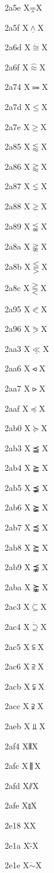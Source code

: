 \documentclass[11pt]{article}
\begin{document}
2a5e X{\ensuremath{\doublebarwedge}}X

2a5f X{\ensuremath{\underline{\wedge}}}X

2a6d X{\ensuremath{\dot{\cong}}}X

2a6f X{\ensuremath{\hat{\approx}}}X

2a74 X{\ensuremath{\Coloneqq}}X

2a7d X{\ensuremath{\leqslant}}X

2a7e X{\ensuremath{\geqslant}}X

2a85 X{\ensuremath{\lessapprox}}X

2a86 X{\ensuremath{\gtrapprox}}X

2a87 X{\ensuremath{\lneq}}X

2a88 X{\ensuremath{\gneq}}X

2a89 X{\ensuremath{\lnapprox}}X

2a8a X{\ensuremath{\gnapprox}}X

2a8b X{\ensuremath{\lesseqqgtr}}X

2a8c X{\ensuremath{\gtreqqless}}X

2a95 X{\ensuremath{\eqslantless}}X

2a96 X{\ensuremath{\eqslantgtr}}X

2aa3 X{\ensuremath{\underline{\ll}}}X

2aa6 X{\ensuremath{\leftslice}}X

2aa7 X{\ensuremath{\rightslice}}X

2aaf X{\ensuremath{\preceq}}X

2ab0 X{\ensuremath{\succeq}}X

2ab3 X{\ensuremath{\preceqq}}X

2ab4 X{\ensuremath{\succeqq}}X

2ab5 X{\ensuremath{\precneqq}}X

2ab6 X{\ensuremath{\succneqq}}X

2ab7 X{\ensuremath{\precapprox}}X

2ab8 X{\ensuremath{\succapprox}}X

2ab9 X{\ensuremath{\precnapprox}}X

2aba X{\ensuremath{\succnapprox}}X

2ac3 X{\ensuremath{\dot{\subseteq}}}X

2ac4 X{\ensuremath{\dot{\supseteq}}}X

2ac5 X{\ensuremath{\subseteqq}}X

2ac6 X{\ensuremath{\supseteqq}}X

2acb X{\ensuremath{\subsetneqq}}X

2acc X{\ensuremath{\supsetneqq}}X

2aeb X{\ensuremath{\Perp}}X

2af4 X{\ensuremath{\interleave}}X

2afc X{\ensuremath{\biginterleave}}X

2afd X{\ensuremath{\sslash}}X

2afe X{\ensuremath{\talloblong}}X

2e18 X{\textinterrobangdown}X

2e1a X{\"{-}}X

2e1e X{\ensuremath{\dot{\sim}}}X
\end{document}
